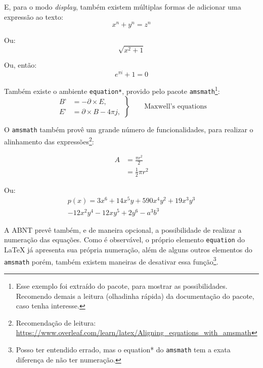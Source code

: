   E, para o modo \textit{display}, também existem múltiplas formas de adicionar uma expressão ao texto:
  \[ x^n + y^n = z^n \]
  
  Ou:
  \begin{displaymath}
    \sqrt{x^2+1}
  \end{displaymath}
  
  Ou, então:
  \begin{equation}
    e^{\pi i} + 1 = 0
  \end{equation}

  Também existe o ambiente \texttt{equation*}, provido pelo pacote \texttt{amsmath}\footnote{Esse exemplo foi extraído do pacote, para mostrar as possibilidades. Recomendo demais a leitura (olhadinha rápida) da documentação do pacote, caso tenha interesse.}:
  \begin{equation*}
    \left.\begin{aligned}
    B’&=-\partial\times E,\\
    E’&=\partial\times B - 4\pi j,
    \end{aligned}
    \right\}
    \qquad \text{Maxwell’s equations}
  \end{equation*}

  O \texttt{amsmath} também provê um grande número de funcionalidades, para realizar o alinhamento das expressões\footnote{Recomendação de leitura: \url{https://www.overleaf.com/learn/latex/Aligning_equations_with_amsmath}}:
  
  \begin{equation}
    \begin{split}
      A& = \frac{\pi r^2}{2} \\
       & = \frac{1}{2} \pi r^2
    \end{split}
  \end{equation}
  
  Ou:
  \begin{multline}
    p(x) = 3x^6 + 14x^5y + 590x^4y^2 + 19x^3y^3\\ 
    - 12x^2y^4 - 12xy^5 + 2y^6 - a^3b^3
  \end{multline}

  A ABNT prevê também, e de maneira opcional, a possibilidade de realizar a numeração das equações. Como é observável, o próprio elemento \texttt{equation} do \LaTeX{} já apresenta sua própria numeração, além de alguns outros elementos do \texttt{amsmath} porém, também existem maneiras de desativar essa função\footnote{Posso ter entendido errado, mas o equation* do \texttt{amsmath} tem a exata diferença de não ter numeração.}.


